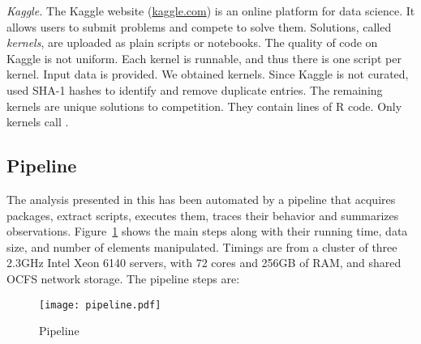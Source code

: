 \documentclass[screen,acmsmall]{acmart}
\newcommand{\mypara}[1]{\medskip\noindent\emph{#1}\xspace}
\begin{document}
\mypara{Kaggle.} The Kaggle website (\small{\url{kaggle.com}}) is an online
platform for data science. It allows users to submit problems and compete to
solve them. Solutions, called \emph{kernels}, are uploaded as plain scripts or
notebooks. The quality of code on Kaggle is not uniform. Each kernel is
runnable, and thus there is one script per kernel. Input data is provided. We
obtained \KaggleKernels kernels. Since Kaggle is not curated, used SHA-1 hashes
to identify and remove \KaggleDuplicates duplicate entries. The remaining
\KaggleUnique kernels are unique solutions to \KaggleCompetitions competition.
They contain \KaggleCode lines of R code. Only \KaggleWithEvals kernels call
\eval.

\subsection{Pipeline}

The analysis presented in this has been automated by a pipeline that acquires
packages, extract scripts, executes them, traces their behavior and summarizes
observations. Figure~\ref{fig:pipeline} shows the main steps along with their
running time, data size, and number of elements manipulated. Timings are from a
cluster of three 2.3GHz Intel Xeon 6140 servers, with 72 cores and 256GB of RAM,
and shared OCFS network storage. The pipeline steps are:


\begin{figure}[!h]\hspace{-5mm}
  \texttt{[image: pipeline.pdf]}
  \caption{Pipeline}\label{fig:pipeline}
\end{figure}
\end{document}
